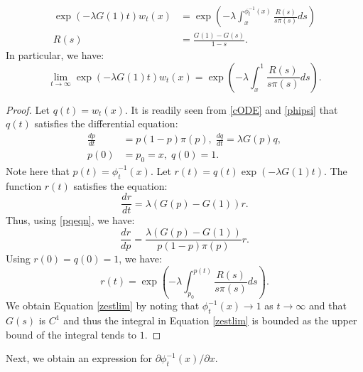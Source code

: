 \documentclass[11pt]{article}
\numberwithin{equation}{section}
\newcommand{\paren}[1]{\left(#1\right)}
\newcommand{\D}[2]{\frac{d#1}{d#2}}
\begin{document}
{\begin{lemma}
\begin{equation}\label{wtest}
\begin{split}
\exp(-\lambda G(1)t)w_t(x)&=\exp\paren{-\lambda \int_x^{\phi_t^{-1}(x)}\frac{R(s)}{s\pi(s)}ds}\\
R(s)&=\frac{G(1)-G(s)}{1-s}.
\end{split}
\end{equation}
In particular, we have:
\begin{equation}\label{wtestlim}
\lim_{t\to \infty} \exp(-\lambda G(1) t)w_t(x)=\exp\paren{-\lambda \int_x^1\frac{R(s)}{s\pi(s)}ds}.
\end{equation}
\end{lemma}
\begin{proof}
Let $q(t)=w_t(x)$. It is readily seen from \eqref{cODE} and \eqref{phipsi} that $q(t)$ satisfies the differential equation:
\begin{equation}\label{pqeqn}
\begin{split}
\D{p}{t}&=p(1-p)\pi(p), \; \D{q}{t}=\lambda G(p) q,\\
p(0)&=p_0=x, \; q(0)=1.
\end{split}
\end{equation}
Note here that $p(t)=\phi_t^{-1}(x)$. Let $r(t)=q(t)\exp(-\lambda G(1)t)$. The function $r(t)$ satisfies the equation:
\begin{equation}
\D{r}{t}=\lambda(G(p)-G(1))r.
\end{equation}
Thus, using \eqref{pqeqn}, we have:
\begin{equation}
\D{r}{p}=\frac{\lambda (G(p)-G(1))}{p(1-p)\pi(p)}r.
\end{equation}
Using $r(0)=q(0)=1$, we have:
\begin{equation}
r(t)=\exp\paren{-\lambda \int_{p_0}^{p(t)}\frac{R(s)}{s\pi(s)}ds}.
\end{equation}
We obtain Equation \eqref{zestlim} by noting that $\phi_t^{-1}(x)\to 1$ as $t\to \infty$ 
and that $G(s)$ is $C^1$ and thus the integral in Equation \eqref{zestlim} is bounded as the upper bound of the integral tends to $1$.
\end{proof}

Next, we obtain an expression for $\partial\phi_t^{-1}(x)/\partial x$.

}
\end{document}
